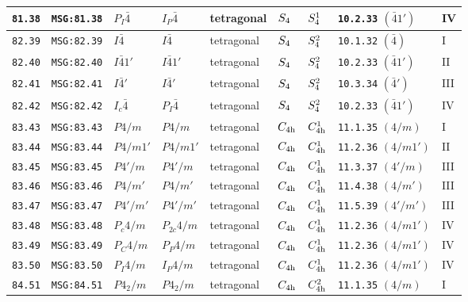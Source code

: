 \documentclass[fleqn,10pt]{jsarticle}
\begin{document}
\begin{center}
\begin{longtable}{lllllllll}
\texttt{81.38} & \texttt{MSG:81.38} & $P_{I}\bar{4}$ & $I_{P}\bar{4}$ & tetragonal & $S_{\rm 4}$ & $S_{\rm 4}^{1}$ & \texttt{10.2.33} $(\bar{4}1')$ & IV \\ \hline
\texttt{82.39} & \texttt{MSG:82.39} & $I\bar{4}$ & $I\bar{4}$ & tetragonal & $S_{\rm 4}$ & $S_{\rm 4}^{2}$ & \texttt{10.1.32} $(\bar{4})$ & I \\
\texttt{82.40} & \texttt{MSG:82.40} & $I\bar{4}1'$ & $I\bar{4}1'$ & tetragonal & $S_{\rm 4}$ & $S_{\rm 4}^{2}$ & \texttt{10.2.33} $(\bar{4}1')$ & II \\
\texttt{82.41} & \texttt{MSG:82.41} & $I\bar{4}'$ & $I\bar{4}'$ & tetragonal & $S_{\rm 4}$ & $S_{\rm 4}^{2}$ & \texttt{10.3.34} $(\bar{4}')$ & III \\
\texttt{82.42} & \texttt{MSG:82.42} & $I_{c}\bar{4}$ & $P_{I}\bar{4}$ & tetragonal & $S_{\rm 4}$ & $S_{\rm 4}^{2}$ & \texttt{10.2.33} $(\bar{4}1')$ & IV \\ \hline
\texttt{83.43} & \texttt{MSG:83.43} & $P4/m$ & $P4/m$ & tetragonal & $C_{\rm 4h}$ & $C_{\rm 4h}^{1}$ & \texttt{11.1.35} $(4/m)$ & I \\
\texttt{83.44} & \texttt{MSG:83.44} & $P4/m1'$ & $P4/m1'$ & tetragonal & $C_{\rm 4h}$ & $C_{\rm 4h}^{1}$ & \texttt{11.2.36} $(4/m1')$ & II \\
\texttt{83.45} & \texttt{MSG:83.45} & $P4'/m$ & $P4'/m$ & tetragonal & $C_{\rm 4h}$ & $C_{\rm 4h}^{1}$ & \texttt{11.3.37} $(4'/m)$ & III \\
\texttt{83.46} & \texttt{MSG:83.46} & $P4/m'$ & $P4/m'$ & tetragonal & $C_{\rm 4h}$ & $C_{\rm 4h}^{1}$ & \texttt{11.4.38} $(4/m')$ & III \\
\texttt{83.47} & \texttt{MSG:83.47} & $P4'/m'$ & $P4'/m'$ & tetragonal & $C_{\rm 4h}$ & $C_{\rm 4h}^{1}$ & \texttt{11.5.39} $(4'/m')$ & III \\
\texttt{83.48} & \texttt{MSG:83.48} & $P_{c}4/m$ & $P_{2c}4/m$ & tetragonal & $C_{\rm 4h}$ & $C_{\rm 4h}^{1}$ & \texttt{11.2.36} $(4/m1')$ & IV \\
\texttt{83.49} & \texttt{MSG:83.49} & $P_{C}4/m$ & $P_{P}4/m$ & tetragonal & $C_{\rm 4h}$ & $C_{\rm 4h}^{1}$ & \texttt{11.2.36} $(4/m1')$ & IV \\
\texttt{83.50} & \texttt{MSG:83.50} & $P_{I}4/m$ & $I_{P}4/m$ & tetragonal & $C_{\rm 4h}$ & $C_{\rm 4h}^{1}$ & \texttt{11.2.36} $(4/m1')$ & IV \\ \hline
\texttt{84.51} & \texttt{MSG:84.51} & $P4_{2}/m$ & $P4_{2}/m$ & tetragonal & $C_{\rm 4h}$ & $C_{\rm 4h}^{2}$ & \texttt{11.1.35} $(4/m)$ & I \\

\end{longtable}
\end{center}
\end{document}
